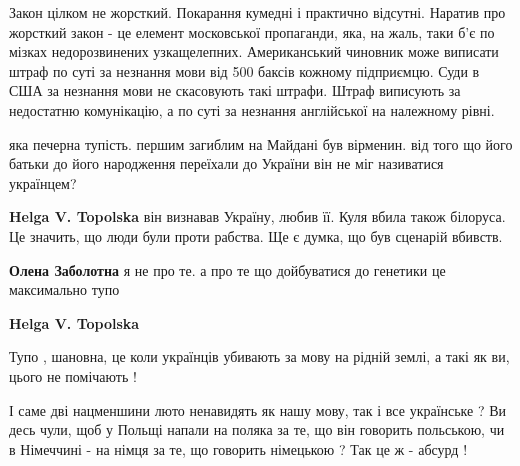 \begin{itemize}
\begin{itemize}
Закон цілком не жорсткий. Покарання кумедні і практично відсутні. Наратив про
жорсткий закон - це елемент московської пропаганди, яка, на жаль, таки б'є по
мізках недорозвинених узкащелепних. Американський чиновник може виписати штраф
по суті за незнання мови від 500 баксів кожному підприємцю. Суди в США за
незнання мови не скасовують такі штрафи. Штраф виписують за недостатню
комунікацію, а по суті за незнання англійської на належному рівні.
\end{itemize}

 

яка печерна тупість. першим загиблим на Майдані був вірменин. від того що його
батьки до його народження переїхали до України він не міг називатися українцем?

\begin{itemize}
 
\textbf{Helga V. Topolska} він визнавав Україну, любив її. Куля вбила також
білоруса. Це значить, що люди були проти рабства. Ще є думка, що був сценарій
вбивств.

\begin{itemize}
 
\textbf{Олена Заболотна} я не про те. а про те що дойбуватися до генетики це максимально тупо


 
\textbf{Helga V. Topolska} 

Тупо , шановна, це коли українців убивають за мову на рідній землі, а такі як
ви, цього не помічають ! 

І саме дві нацменшини люто ненавидять як нашу мову, так і все українське ? Ви
десь чули, щоб у Польщі напали на поляка за те, що він говорить польською, чи в
Німеччині - на німця за те, що говорить німецькою ? Так це ж - абсурд ! 


\end{itemize}
\end{itemize}
\end{itemize}
